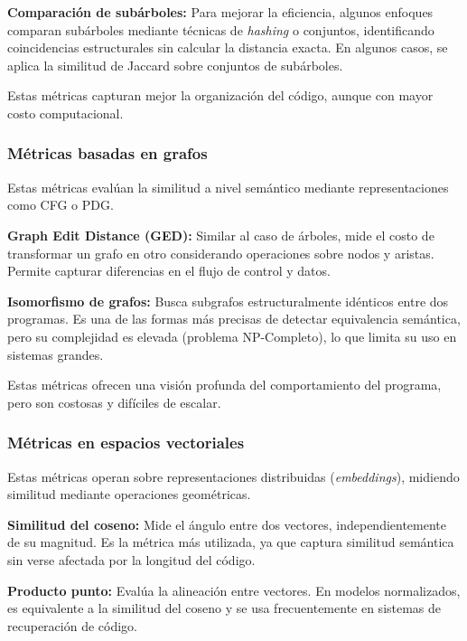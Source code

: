 \textbf{Comparación de subárboles:} Para mejorar la eficiencia, algunos enfoques comparan subárboles mediante técnicas de \textit{hashing} o conjuntos, identificando coincidencias estructurales sin calcular la distancia exacta. En algunos casos, se aplica la similitud de Jaccard sobre conjuntos de subárboles.

Estas métricas capturan mejor la organización del código, aunque con mayor costo computacional.

\subsubsection{Métricas basadas en grafos}

Estas métricas evalúan la similitud a nivel semántico mediante representaciones como CFG o PDG.

\textbf{Graph Edit Distance (GED):} Similar al caso de árboles, mide el costo de transformar un grafo en otro considerando operaciones sobre nodos y aristas. Permite capturar diferencias en el flujo de control y datos.

\textbf{Isomorfismo de grafos:} Busca subgrafos estructuralmente idénticos entre dos programas. Es una de las formas más precisas de detectar equivalencia semántica, pero su complejidad es elevada (problema NP-Completo), lo que limita su uso en sistemas grandes.

Estas métricas ofrecen una visión profunda del comportamiento del programa, pero son costosas y difíciles de escalar.

\subsubsection{Métricas en espacios vectoriales}

Estas métricas operan sobre representaciones distribuidas (\textit{embeddings}), midiendo similitud mediante operaciones geométricas.

\textbf{Similitud del coseno:} Mide el ángulo entre dos vectores, independientemente de su magnitud. Es la métrica más utilizada, ya que captura similitud semántica sin verse afectada por la longitud del código.

\textbf{Producto punto:} Evalúa la alineación entre vectores. En modelos normalizados, es equivalente a la similitud del coseno y se usa frecuentemente en sistemas de recuperación de código.

